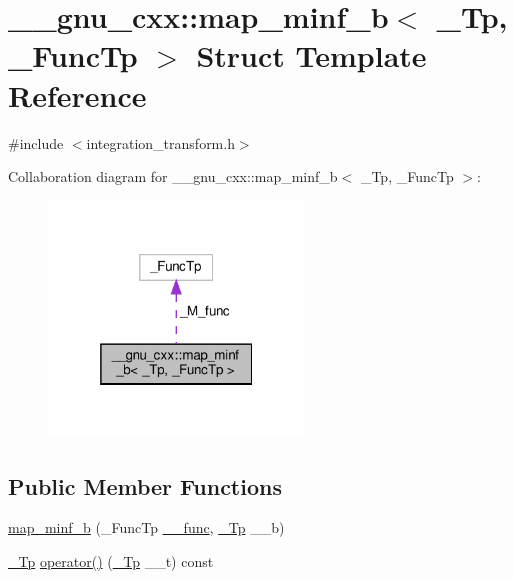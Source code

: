 \hypertarget{struct____gnu__cxx_1_1map__minf__b}{}\section{\+\_\+\+\_\+gnu\+\_\+cxx\+:\+:map\+\_\+minf\+\_\+b$<$ \+\_\+\+Tp, \+\_\+\+Func\+Tp $>$ Struct Template Reference}
\label{struct____gnu__cxx_1_1map__minf__b}


{\ttfamily \#include $<$integration\+\_\+transform.\+h$>$}



Collaboration diagram for \+\_\+\+\_\+gnu\+\_\+cxx\+:\+:map\+\_\+minf\+\_\+b$<$ \+\_\+\+Tp, \+\_\+\+Func\+Tp $>$\+:
\nopagebreak
\begin{figure}[H]
\begin{center}
\leavevmode
\includegraphics[width=193pt]{struct____gnu__cxx_1_1map__minf__b__coll__graph}
\end{center}
\end{figure}
\subsection*{Public Member Functions}
\begin{DoxyCompactItemize}
\item 
\hyperlink{struct____gnu__cxx_1_1map__minf__b_a55f2ab1a754dcf6068232d8186a194da}{map\+\_\+minf\+\_\+b} (\+\_\+\+Func\+Tp \hyperlink{namespace____gnu__cxx_af2b2f0c7a2ae72b922b1afefae5a65b2}{\+\_\+\+\_\+func}, \hyperlink{namespace____gnu__cxx_a3b19a9c800ca194374ef9172290f7d79}{\+\_\+\+Tp} \+\_\+\+\_\+b)
\item 
\hyperlink{namespace____gnu__cxx_a3b19a9c800ca194374ef9172290f7d79}{\+\_\+\+Tp} \hyperlink{struct____gnu__cxx_1_1map__minf__b_a4e9a67a4d37675e4c1ca3e0bff74ade3}{operator()} (\hyperlink{namespace____gnu__cxx_a3b19a9c800ca194374ef9172290f7d79}{\+\_\+\+Tp} \+\_\+\+\_\+t) const
\end{DoxyCompactItemize}
